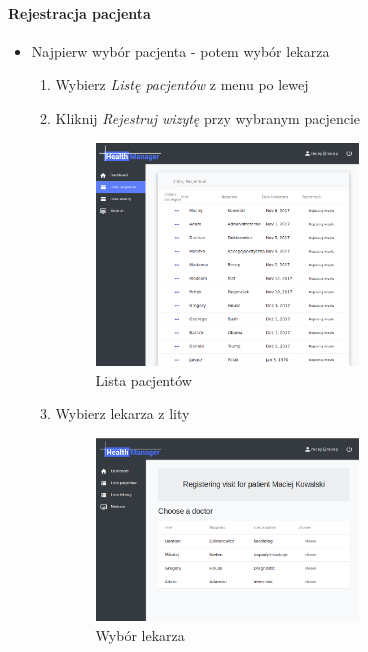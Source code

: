\documentclass[polish,12pt]{aghthesis}
\begin{document}
    \paragraph{Rejestracja pacjenta}{
       \begin{itemize}
           \item Najpierw wybór pacjenta - potem wybór lekarza
           \begin{enumerate}
             \item Wybierz \emph{Listę pacjentów} z menu po lewej
             \item Kliknij \emph{Rejestruj wizytę} przy wybranym pacjencie
               \begin{figure}[H]
               \includegraphics[width=0.7\textwidth]{gui-recep-patientlist}
               \caption{Lista pacjentów}
               \end{figure} 
             \item Wybierz lekarza z lity
               \begin{figure}[H]
               \includegraphics[width=0.7\textwidth]{gui-recep-register-for-patient}
               \caption{Wybór lekarza}
               \end{figure} 

\end{enumerate}
\end{itemize}}
\end{document}
